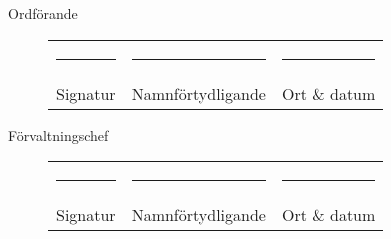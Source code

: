\documentclass[10pt]{article}
\begin{document}
Ordförande
\vspace*{10mm}
\begin{figure}[H]
\begin{tabularx}{\textwidth}{p{} p{} p{}}
    \rule{0.3\textwidth}{0.4pt} &
    \rule{0.3\textwidth}{0.4pt} &
    \rule{0.3\textwidth}{0.4pt} \\
    Signatur &
    Namnförtydligande &
    Ort \& datum \\
\end{tabularx}
\end{figure}

Förvaltningschef
\vspace*{10mm}
\begin{figure}[H]
\begin{tabularx}{\textwidth}{p{} p{} p{}}
    \rule{0.3\textwidth}{0.4pt} &
    \rule{0.3\textwidth}{0.4pt} &
    \rule{0.3\textwidth}{0.4pt} \\
    Signatur &
    Namnförtydligande &
    Ort \& datum \\
\end{tabularx}
\end{figure}
\end{document}
